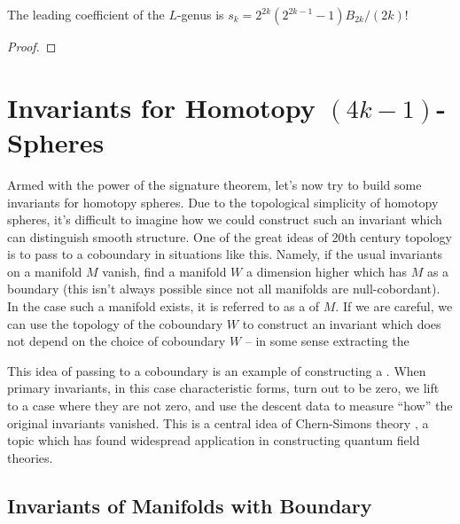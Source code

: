 
\begin{proposition}\label{prop:leading_coefficient_L_genus}
	The leading coefficient of the $L$-genus is $s_k=2^{2k}(2^{2k-1}-1)B_{2k}/(2k)!$
\end{proposition}
\begin{proof}
\end{proof}

\pagebreak
\section{Invariants for Homotopy \texorpdfstring{${(4k-1)}$}{(4k-1)}-Spheres}\label{sec:invariants-for-homotopy-4k-1-spheres}

Armed with the power of the signature theorem, let's now try to build some invariants for homotopy spheres. 
Due to the topological simplicity of homotopy spheres, it's difficult to imagine how we could construct such an invariant which can distinguish smooth structure. One of the great ideas of 20th century topology is to pass to a coboundary in situations like this. Namely, if the usual invariants on a manifold $M$ vanish, find a manifold $W$ a dimension higher which has $M$ as a boundary (this isn't always possible since not all manifolds are null-cobordant). 
In the case such a manifold exists, it is referred to as a  of $M$. If we are careful, we can use the topology of the coboundary $W$ to construct an invariant which does not depend on the choice of coboundary $W$ -- in some sense extracting the 

\begin{remark}
	This idea of passing to a coboundary is an example of constructing a . When primary invariants, in this case characteristic forms, turn out to be zero, we lift to a case where they are not zero, and use the descent data to measure ``how'' the original invariants vanished. This is a central idea of Chern-Simons theory \cite{chernsimons1974geometric}, a topic which has found widespread application in constructing quantum field theories.
\end{remark}

\subsection{Invariants of Manifolds with Boundary}\label{sec:relative-invariants}

